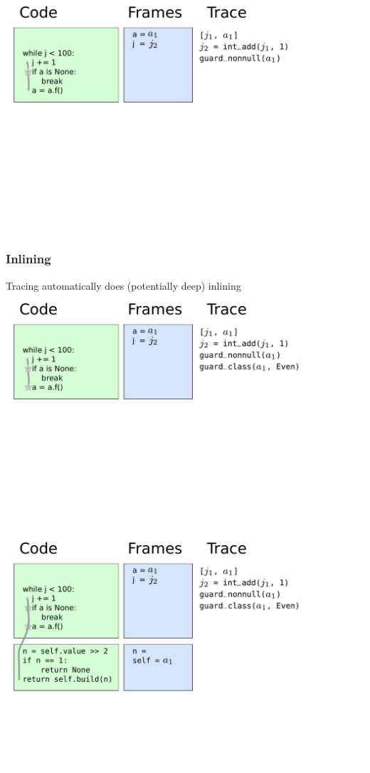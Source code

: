 \documentclass[utf8x]{beamer}
\begin{document}
\begin{frame}
  \includegraphics[scale=0.4]{figures/loop03}
\end{frame}

\begin{frame}
  \frametitle{Inlining}
  Tracing automatically does (potentially deep) inlining
\end{frame}


\begin{frame}
  \includegraphics[scale=0.4]{figures/loop04}
\end{frame}

\begin{frame}
  \includegraphics[scale=0.4]{figures/loop05}
\end{frame}
\end{document}
